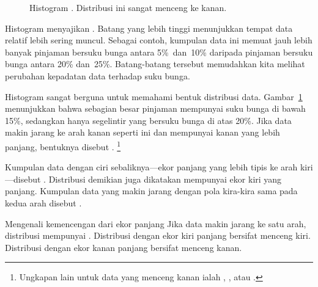 \begin{figure}[bth]
  \centering
  \caption{Histogram .
      Distribusi ini sangat menceng ke kanan.
      }
  \label{loan50IntRateHist}
\end{figure}

Histogram menyajikan .
Batang yang lebih tinggi menunjukkan tempat data relatif lebih
sering muncul. Sebagai contoh, kumpulan data ini memuat jauh lebih
banyak pinjaman bersuku bunga antara 5\%~dan~10\% daripada
pinjaman bersuku bunga antara 20\% dan~25\%.
Batang-batang tersebut memudahkan kita melihat perubahan kepadatan
data terhadap suku bunga.

Histogram sangat berguna untuk memahami bentuk distribusi
data\label{shapeFirstDiscussed}.
Gambar~\ref{loan50IntRateHist} menunjukkan bahwa sebagian besar
pinjaman mempunyai suku bunga di bawah 15\%, sedangkan hanya
segelintir yang bersuku bunga di atas 20\%.
Jika data makin jarang ke arah kanan seperti ini dan mempunyai
 kanan yang lebih panjang,
bentuknya disebut .
\footnote{Ungkapan lain untuk data yang menceng kanan ialah
  ,
  , atau
  .}

Kumpulan data dengan ciri sebaliknya---ekor panjang yang lebih
tipis ke arah kiri---disebut
.
Distribusi demikian juga dikatakan mempunyai ekor kiri yang
panjang. Kumpulan data yang makin jarang dengan pola kira-kira
sama pada kedua arah disebut .

\begin{onebox}{Mengenali kemencengan dari ekor panjang}
  Jika data makin jarang ke satu arah, distribusi mempunyai
  . 
  Distribusi dengan ekor kiri panjang bersifat menceng kiri.
  Distribusi dengan ekor kanan panjang bersifat menceng kanan.
\end{onebox}

